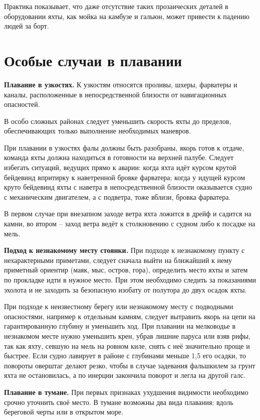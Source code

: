Практика показывает, что даже отсутствие таких прозаических деталей в оборудовании яхты, как мойка на камбузе и гальюн, может привести к падению людей за борт.

\section{Особые случаи в плавании}

\textbf{Плавание в узкостях.} К узкостям относятся проливы, шхеры, фарватеры и каналы, расположенные в непосредственной близости от навигационных опасностей.

В особо сложных районах следует уменьшить скорость яхты до пределов, обеспечивающих только выполнение необходимых маневров.

При плавании в узкостях фалы должны быть разобраны, якорь готов к отдаче, команда яхты должна находиться в готовности на верхней палубе. Следует избегать ситуаций, ведущих прямо к аварии: когда яхта идёт курсом крутой бейдевинд впритирку к наветренной бровке фарватера; когда у идущей курсом круто бейдевинд яхты с наветра в непосредственной близости оказывается судно с механическим двигателем, а с подветра, тоже вблизи, бровка фарватера.

В первом случае при внезапном заходе ветра яхта ложится в дрейф и садится на камни, во втором \--- заход ветра ведёт к столкновению с судном либо к посадке на мель.

\textbf{Подход к незнакомому месту стоянки.} При подходе к незнакомому пункту с нехарактерными приметами, следует сначала выйти на ближайший к нему приметный ориентир (маяк, мыс, остров, гора), определить место яхты и затем по прокладке идти в нужное место. При этом необходимо следить за показаниями эхолота и не заходить за безопасную изобату от полутора до двух осадок яхты.

При подходе к неизвестному берегу или незнакомому месту с подводными опасностями, например к отдельным камням, следует вытравить якорь на цепи на гарантированную глубину и уменьшить ход. При плавании на мелководье в незнакомом месте нужно уменьшить крен, убрав лишние паруса или взяв рифы, так как яхту, севшую на мель на ровном киле, снять с неё значительно проще и быстрее. Если судно лавирует в районе с глубинами меньше 1,5 его осадки, то повороты оверштаг делают резко, чтобы в случае задевания фальшкилем за грунт яхта не остановилась, а по инерции закончила поворот и легла на другой галс.

\textbf{Плавание в тумане.} При первых признаках ухудшения видимости необходимо срочно уточнить своё место. В тумане возможны два вида плавания: вдоль береговой черты или в открытом море.

